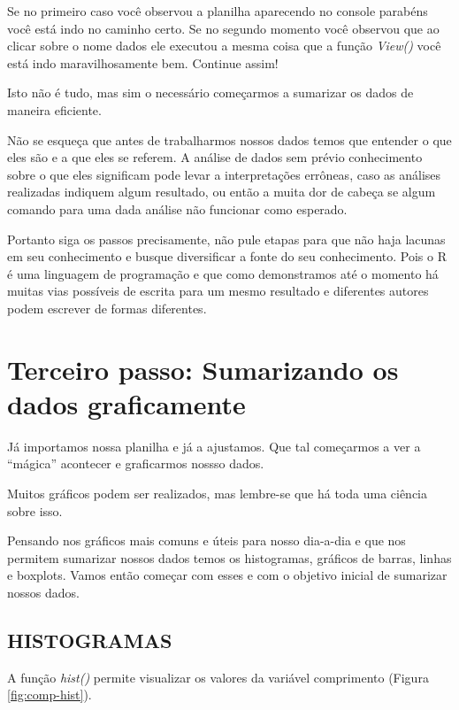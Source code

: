 \documentclass[]{book}
\begin{document}
Se no primeiro caso você observou a planilha aparecendo no console parabéns você está indo no caminho certo. Se no segundo momento você observou que ao clicar sobre o nome dados ele executou a mesma coisa que a função \emph{View()} você está indo maravilhosamente bem. Continue assim!

Isto não é tudo, mas sim o necessário começarmos a sumarizar os dados de maneira eficiente.

Não se esqueça que antes de trabalharmos nossos dados temos que entender o que eles são e a que eles se referem. A análise de dados sem prévio conhecimento sobre o que eles significam pode levar a interpretações errôneas, caso as análises realizadas indiquem algum resultado, ou então a muita dor de cabeça se algum comando para uma dada análise não funcionar como esperado.

Portanto siga os passos precisamente, não pule etapas para que não haja lacunas em seu conhecimento e busque diversificar a fonte do seu conhecimento. Pois o R é uma linguagem de programação e que como demonstramos até o momento há muitas vias possíveis de escrita para um mesmo resultado e diferentes autores podem escrever de formas diferentes.

\hypertarget{terceiro-passo-sumarizando-os-dados-graficamente}{%
\section{Terceiro passo: Sumarizando os dados graficamente}\label{terceiro-passo-sumarizando-os-dados-graficamente}}

Já importamos nossa planilha e já a ajustamos. Que tal começarmos a ver a ``mágica'' acontecer e graficarmos nossso dados.

Muitos gráficos podem ser realizados, mas lembre-se que há toda uma ciência sobre isso.

Pensando nos gráficos mais comuns e úteis para nosso dia-a-dia e que nos permitem sumarizar nossos dados temos os histogramas, gráficos de barras, linhas e boxplots. Vamos então começar com esses e com o objetivo inicial de sumarizar nossos dados.

\hypertarget{histogramas}{%
\subsection{HISTOGRAMAS}\label{histogramas}}

A função \emph{hist()} permite visualizar os valores da variável comprimento (Figura \ref{fig:comp-hist}).
\end{document}
